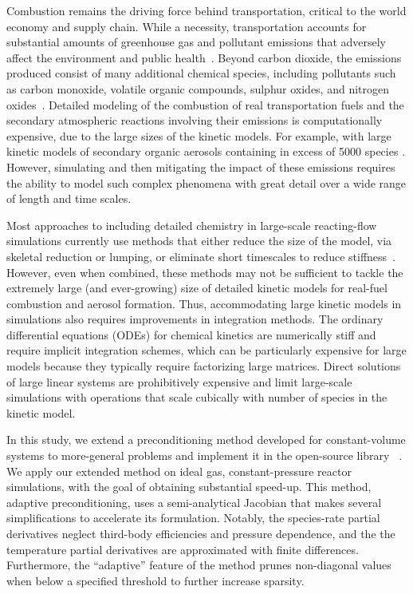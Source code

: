 \documentclass[twocolumn,10pt]{article}
\begin{document}
Combustion remains the driving force behind transportation, critical to the world economy and supply chain.
While a necessity, transportation accounts for substantial amounts of greenhouse gas and pollutant emissions that adversely affect the environment and public health~\cite{van_fan_review_2018, manisalidis_environmental_2020}.
Beyond carbon dioxide, the emissions produced consist of many additional chemical species, including pollutants such as carbon monoxide, volatile organic compounds, sulphur oxides, and nitrogen oxides~\cite{van_fan_review_2018}.
Detailed modeling of the combustion of real transportation fuels and the secondary atmospheric reactions involving their emissions is computationally expensive, due to the large sizes of the kinetic models.
For example, with large kinetic models of secondary organic aerosols containing in excess of 5000 species \cite{li_modeling_2015}.
However, simulating and then mitigating the impact of these emissions requires the ability to model such complex phenomena with great detail over a wide range of length and time scales.

Most approaches to including detailed chemistry in large-scale reacting-flow simulations currently use methods that either reduce the size of the model, via skeletal reduction or lumping, or eliminate short timescales to reduce stiffness~\cite{Lu2009, Pepiot2019}.
However, even when combined, these methods may not be sufficient to tackle the extremely large (and ever-growing) size of detailed kinetic models for real-fuel combustion and aerosol formation.
Thus, accommodating large kinetic models in simulations also requires improvements in integration methods.
The ordinary differential equations (ODEs) for chemical kinetics are numerically stiff and require implicit integration schemes, which can be particularly expensive for large models because they typically require factorizing large matrices.
Direct solutions of large linear systems are prohibitively expensive and limit large-scale simulations with operations that scale cubically with number of species in the kinetic model.

In this study, we extend a preconditioning method developed for constant-volume systems \cite{mcnenly_faster_2015} to more-general problems and implement it in the open-source library \cantera{}~\cite{cantera}.
We apply our extended method on ideal gas, constant-pressure reactor simulations, with the goal of obtaining substantial speed-up.
This method, adaptive preconditioning, uses a semi-analytical Jacobian that makes several simplifications to accelerate its formulation.
Notably, the species-rate partial derivatives neglect third-body efficiencies and pressure dependence, and the
the temperature partial derivatives are approximated with finite differences.
Furthermore, the ``adaptive'' feature of the method prunes non-diagonal values when below a specified threshold to further increase sparsity.
\end{document}
